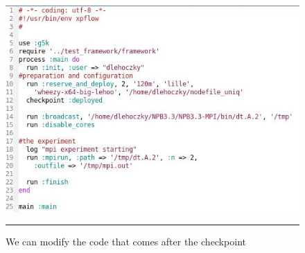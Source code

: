 \begin{figure}[htbp]
  \centering
    \includegraphics[scale=0.7]{./Figures/checkpoint2.jpg}
    \rule{35em}{0.5pt}
  \caption[Checkpoint example - code modification after checkpoint]{We
    can modify the code that comes after the checkpoint}
  \label{fig:checkpoint2}
\end{figure}

